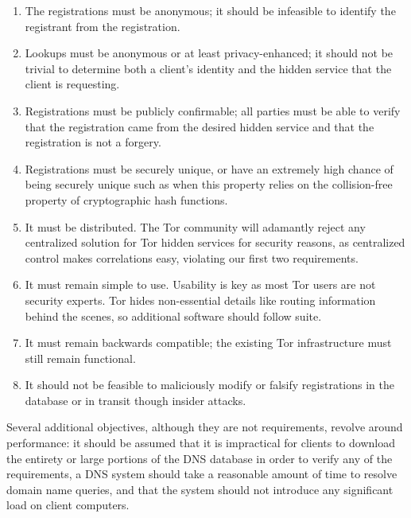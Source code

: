 \begin{enumerate}
	\item The registrations must be anonymous; it should be infeasible to identify the registrant from the registration.
	\item Lookups must be anonymous or at least privacy-enhanced; it should not be trivial to determine both a client's identity and the hidden service that the client is requesting.
	\item Registrations must be publicly confirmable; all parties must be able to verify that the registration came from the desired hidden service and that the registration is not a forgery. %
	\item Registrations must be securely unique, or have an extremely high chance of being securely unique such as when this property relies on the collision-free property of cryptographic hash functions.
	\item It must be distributed. The Tor community will adamantly reject any centralized solution for Tor hidden services for security reasons, as centralized control makes correlations easy, violating our first two requirements.
	\item It must remain simple to use. Usability is key as most Tor users are not security experts. Tor hides non-essential details like routing information behind the scenes, so additional software should follow suite. %
	\item It must remain backwards compatible; the existing Tor infrastructure must still remain functional.
	\item It should not be feasible to maliciously modify or falsify registrations in the database or in transit though insider attacks.
\end{enumerate}

Several additional objectives, although they are not requirements, revolve around performance: it should be assumed that it is impractical for clients to download the entirety or large portions of the DNS database in order to verify any of the requirements, a DNS system should take a reasonable amount of time to resolve domain name queries, and that the system should not introduce any significant load on client computers.
